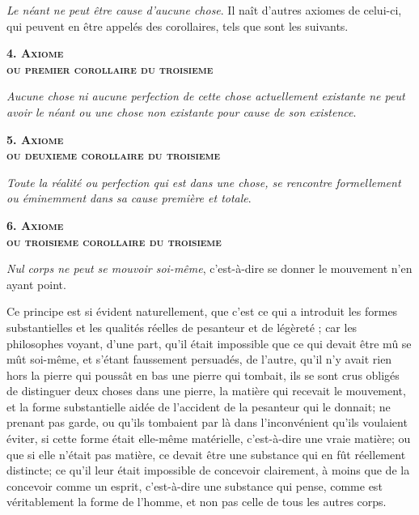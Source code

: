 	\emph{Le néant ne peut être cause d'aucune chose}. Il naît d'autres axiomes de celui-ci, qui peuvent en être appelés des corollaires, tels que sont les suivants.


\begin{center}{\scshape\bfseries 4. Axiome \\ou premier corollaire du troisieme}\end{center}

	\emph{Aucune chose ni aucune perfection de cette chose actuellement existante ne peut avoir le néant ou une chose non existante pour cause de son existence}.

\begin{center}{\scshape\bfseries 5. Axiome \\ou deuxieme corollaire du troisieme}\end{center}

	\emph{Toute la réalité ou perfection qui est dans une chose, se rencontre formellement ou éminemment dans sa cause première et totale}.

\newpage

\begin{center}{\scshape\bfseries 6. Axiome \\ou troisieme corollaire du troisieme}\end{center}

	\emph{Nul corps ne peut se mouvoir soi-même}, c'est-à-dire se donner le mouvement n'en ayant point.

Ce principe est si évident naturellement, que c'est ce qui a introduit les formes substantielles et les qualités réelles de pesanteur et de légèreté ; car les philosophes voyant, d'une part, qu'il était impossible que ce qui devait être mû se mût soi-même, et s'étant faussement persuadés, de l'autre, qu'il n'y avait rien hors la pierre qui poussât en bas une pierre qui tombait, ils se sont crus obligés de distinguer deux choses dans une pierre, la matière qui recevait le mouvement, et la forme substantielle aidée de l'accident de la pesanteur qui le donnait; ne prenant pas garde, ou qu'ils tombaient par là dans l'inconvénient qu'ils voulaient éviter, si cette forme était elle-même matérielle, c'est-à-dire une vraie matière; ou que si elle n'était pas matière, ce devait être une substance qui en fût réellement distincte; ce qu'il leur était impossible de concevoir clairement, à moins que de la concevoir comme un esprit, c'est-à-dire une substance qui pense, comme est véritablement la forme de l'homme, et non pas celle de tous les autres corps.

